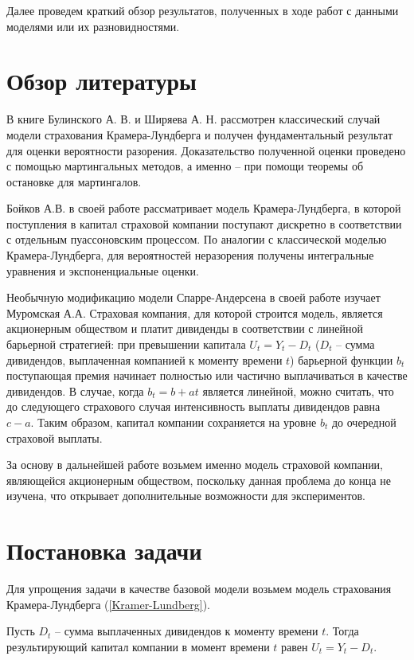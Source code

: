 \documentclass{article}
\theoremstyle{plain}
\theoremstyle{plain}
\theoremstyle{plain}
\theoremstyle{plain}
\theoremstyle{definition}
\theoremstyle{remark}
\begin{document}
Далее проведем краткий обзор результатов, полученных в ходе работ с данными моделями или их разновидностями.
    
\section{Обзор литературы}

В книге Булинского А. В. и Ширяева А. Н. \cite{Shiryaev_stochastic} рассмотрен классический случай модели страхования Крамера-Лундберга и получен фундаментальный результат для оценки вероятности разорения. Доказательство полученной оценки проведено с помощью мартингальных методов, а именно -- при помощи теоремы об остановке для мартингалов. 

Бойков А.В. в своей работе \cite{KL_premium} рассматривает модель Крамера-Лундберга, в которой поступления в капитал страховой компании поступают дискретно в соответствии с отдельным пуассоновским процессом. По аналогии с классической моделью Крамера-Лундберга, для вероятностей неразорения получены интегральные уравнения и экспоненциальные оценки.

Необычную модификацию модели Спарре-Андерсена в своей работе \cite{SA_dividends} изучает Муромская А.А. Страховая компания, для которой строится модель, является акционерным обществом и платит дивиденды в соответствии с линейной барьерной стратегией: при превышении капитала $U_t = Y_t - D_t$ ($D_t$ -- сумма дивидендов, выплаченная компанией к моменту времени $t$) барьерной функции $b_t$ поступающая премия начинает полностью или частично выплачиваться в качестве дивидендов. В случае, когда $b_t = b + at$ является линейной, можно считать, что до следующего страхового случая интенсивность выплаты дивидендов равна $c - a$. Таким образом, капитал компании сохраняется на уровне $b_t$ до очередной страховой выплаты.

За основу в дальнейшей работе возьмем именно модель страховой компании, являющейся акционерным обществом, поскольку данная проблема до конца не изучена, что открывает дополнительные возможности для экспериментов.

\section{Постановка задачи}
\label{Problem_Description}

Для упрощения задачи в качестве базовой модели возьмем модель страхования Крамера-Лундберга (\ref{Kramer-Lundberg}).

Пусть $D_t$ -- сумма выплаченных дивидендов к моменту времени $t$. Тогда результирующий капитал компании в момент времени $t$ равен $U_t = Y_t - D_t$.
\end{document}
